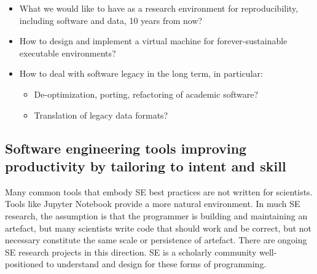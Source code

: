 \documentclass[a4paper,UKenglish]{dagman}
\begin{document}
\begin{itemize}
\item What we would like to have as a research environment for reproducibility, including  software and data, 10 years from now? 
\item How to design and implement a virtual machine for forever-sustainable executable environments? 
\item How to deal with software legacy in the long term, in particular:
    \begin{itemize}
    \item De-optimization, porting, refactoring of academic software?
    \item Translation of legacy data formats?
    \end{itemize}
\end{itemize}



\subsection{Software engineering tools improving productivity by tailoring to intent and skill}

Many common tools that embody SE best practices are not written for scientists. Tools like Jupyter Notebook provide a more natural environment. In much SE research, the assumption is that the programmer is building and maintaining an artefact, but many scientists write code that should work and be correct, but not necessary constitute the same scale or persistence of artefact. There are ongoing SE research projects in this direction. SE is a scholarly community well-positioned to understand and design for these forms of programming.
\end{document}
